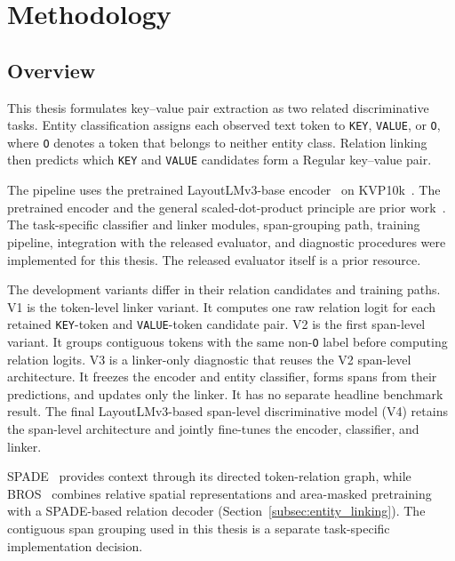 \chapter{Methodology}
\label{ch:methodology}

\section{Overview}
\label{sec:methodology-overview}

This thesis formulates key--value pair extraction as two related
discriminative tasks. Entity classification assigns each observed text token
to \texttt{KEY}, \texttt{VALUE}, or \texttt{O}, where \texttt{O} denotes a
token that belongs to neither entity class. Relation linking then predicts
which \texttt{KEY} and \texttt{VALUE} candidates form a Regular key--value
pair.

The pipeline uses the pretrained LayoutLMv3-base encoder~\cite{layoutlmv3} on
KVP10k~\cite{kvp10k}. The pretrained encoder and the general
scaled-dot-product principle are prior work~\cite{layoutlmv3,vaswani2017attention}.
The task-specific classifier and linker modules, span-grouping path, training
pipeline, integration with the released evaluator, and diagnostic procedures
were implemented for this thesis. The released evaluator itself is a prior
resource.

The development variants differ in their relation candidates and training
paths. V1 is the token-level linker variant. It computes one raw relation
logit for each retained \texttt{KEY}-token and \texttt{VALUE}-token candidate
pair. V2 is the first span-level variant. It groups contiguous tokens with the
same non-\texttt{O} label before computing relation logits. V3 is a
linker-only diagnostic that reuses the V2 span-level architecture. It freezes
the encoder and entity classifier, forms spans from their predictions, and
updates only the linker. It has no separate headline benchmark result. The
final LayoutLMv3-based span-level discriminative model (V4) retains the
span-level architecture and jointly fine-tunes the encoder, classifier, and
linker.

SPADE~\cite{spade} provides context through its directed token-relation graph,
while BROS~\cite{bros} combines relative spatial representations and
area-masked pretraining with a SPADE-based relation decoder
(Section~\ref{subsec:entity_linking}). The contiguous span grouping used in
this thesis is a separate task-specific implementation decision.

